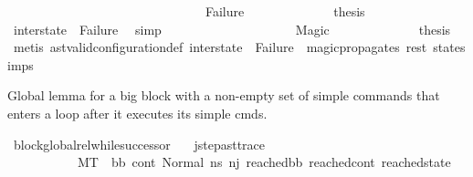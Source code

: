 \begin{isabellebody}
\ \ \ \ \ \ \ \ \ \ \isamarkupfalse%
\isanewline
\ \ \ \ \ \ \ \ \isamarkupfalse%
\isanewline
\ \ \ \ \ \ \ \ \ \ \isamarkupfalse%
\ Failure\isanewline
\ \ \ \ \ \ \ \ \ \ \isamarkupfalse%
\ \isamarkupfalse%
\ {\isacharquery}{\kern0pt}thesis\ \isamarkupfalse%
\ {\isacartoucheopen}inter{\isacharunderscore}{\kern0pt}state\ {\isasymnoteq}\ Failure{\isacartoucheclose}\ \isamarkupfalse%
\ simp\isanewline
\ \ \ \ \ \ \ \ \isamarkupfalse%
\isanewline
\ \ \ \ \ \ \ \ \ \ \isamarkupfalse%
\ Magic\isanewline
\ \ \ \ \ \ \ \ \ \ \isamarkupfalse%
\ \isamarkupfalse%
\ {\isacharquery}{\kern0pt}thesis\ \isamarkupfalse%
\ {\isacharparenleft}{\kern0pt}metis\ ast{\isacharunderscore}{\kern0pt}valid{\isacharunderscore}{\kern0pt}configuration{\isacharunderscore}{\kern0pt}def\ {\isacartoucheopen}inter{\isacharunderscore}{\kern0pt}state\ {\isasymnoteq}\ Failure{\isacartoucheclose}\ \ magic{\isacharunderscore}{\kern0pt}propagates\ rest\ state{\isachardot}{\kern0pt}simps{\isacharparenleft}{\kern0pt}{}{\isacharparenright}{\kern0pt}{\isacharparenright}{\kern0pt}\isanewline
\ \ \ \ \ \ \ \ \isamarkupfalse%
\isanewline
\ \ \ \ \ \ \isamarkupfalse%
\isanewline
\ \ \ \ \isamarkupfalse%
\isanewline
\ \ \isamarkupfalse%
\isanewline
{}\isamarkupfalse%
%
\endisatagproof
{\isafoldproof}%
%
\isadelimproof
%
\endisadelimproof
%
\begin{isamarkuptext}%
Global lemma for a big block with a non-empty set of simple commands that enters a loop after it executes its simple cmds.%
\end{isamarkuptext}\isamarkuptrue%
\isamarkupfalse%
\ block{\isacharunderscore}{\kern0pt}global{\isacharunderscore}{\kern0pt}rel{\isacharunderscore}{\kern0pt}while{\isacharunderscore}{\kern0pt}successor{\isacharcolon}{\kern0pt}\isanewline
\ \ \ j{\isacharunderscore}{\kern0pt}step{\isacharunderscore}{\kern0pt}ast{\isacharunderscore}{\kern0pt}trace{\isacharcolon}{\kern0pt}\ \isanewline
\ \ \ \ \ \ \ \ \ \ \ {\isachardoublequoteopen}M{\isacharcomma}{\kern0pt}{\isasymLambda}{\isacharcomma}{\kern0pt}{\isasymGamma}{\isacharcomma}{\kern0pt}{\isasymOmega}{\isacharcomma}{\kern0pt}T\ {\isasymturnstile}\ {\isacharparenleft}{\kern0pt}bb{\isacharcomma}{\kern0pt}\ cont{}{\isacharcomma}{\kern0pt}\ Normal\ ns{}{\isacharparenright}{\kern0pt}\ {\isacharminus}{\kern0pt}n{\isasymlongrightarrow}{\isacharcircum}{\kern0pt}j\ {\isacharparenleft}{\kern0pt}reached{\isacharunderscore}{\kern0pt}bb{\isacharcomma}{\kern0pt}\ reached{\isacharunderscore}{\kern0pt}cont{\isacharcomma}{\kern0pt}\ reached{\isacharunderscore}{\kern0pt}state{\isacharparenright}{\kern0pt}{\isachardoublequoteclose}\isanewline

\end{isabellebody}
